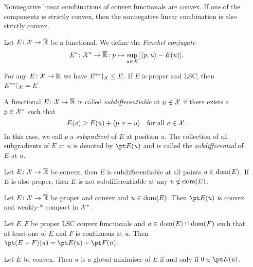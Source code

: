 \begin{lemma}
	Nonnegative linear combinations of convex functionals are convex. If one of the components is strictly convex, then the nonnegative linear combination is also strictly convex. 
\end{lemma}

\begin{definition}
	Let $E \colon \mathcal X \to \overline{\mathbb R}$ be a functional. We define the \emph{Fenchel conjugate}
	\[
	E^* \colon \mathcal X^* \to \overline{\mathbb R} \colon p \mapsto \sup_{u \in \mathcal X} \qty[ \langle p, u\rangle - E(u)]. 
	\]
\end{definition}

\begin{theorem}
	For any $E \colon \mathcal X \to \mathbb R$ we have $E^{**} \mathord\restriction_{\mathcal X} \leq E$. If $E$ is proper and LSC, then $E^{**} \mathord\restriction_{\mathcal X} = E$. 
\end{theorem}

\begin{definition}
	A functional $E \colon \mathcal X \to \overline{\mathbb R}$ is called \emph{subdifferentiable} at $u \in \mathcal X$ if there exists a $p \in \mathcal X^*$ such that
	\[
	E(v) \geq E(u) + \langle p, v - u\rangle \quad\text{for all $v \in \mathcal X$}. 
	\]
	In this case, we call $p$ a \emph{subgradient} of $E$ at position $u$. The collection of all subgradients of $E$ at $u$ is denoted by $\pt E(u)$ and is called the \emph{subdifferential} of $E$ at $u$. 
\end{definition}

\begin{lemma}
	Let $E \colon \mathcal X \to \overline{\mathbb R}$ be convex, then $E$ is subdifferentiable at all points $u \in \operatorname{dom}(E)$. If $E$ is also proper, then $E$ is not subdifferentiable at any $u \notin \operatorname{dom}(E)$. 
\end{lemma}

\begin{theorem}
	Let $E \colon \mathcal X \to \overline{\mathbb R}$ be proper and convex and $u \in \operatorname{dom}(E)$. Then $\pt E(u)$ is convex and weakly-$*$ compact in $\mathcal X^*$. 
\end{theorem}

\begin{theorem}
	Let $E, F$ be proper LSC convex functionals and $u \in \operatorname{dom}(E) \cap \operatorname{dom}(F)$ such that at least one of $E$ and $F$ is continuous at $u$. Then $\pt(E + F)(u) = \pt E(u) + \pt F(u)$. 
\end{theorem}

\begin{theorem}
	Let $E$ be convex. Then $u$ is a global minimiser of $E$ if and only if $0 \in \pt E(u)$. 
\end{theorem}


